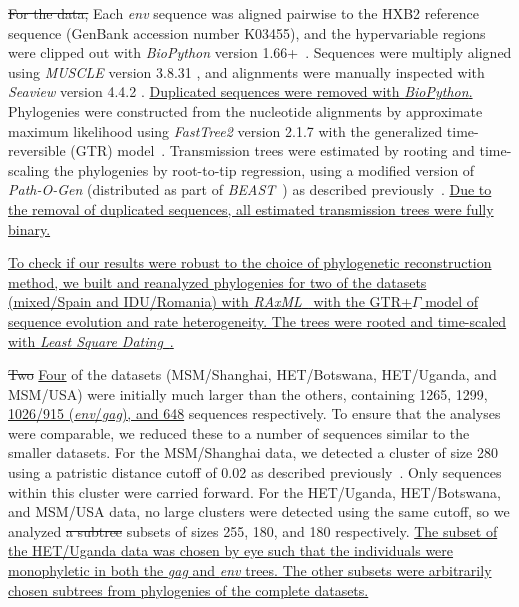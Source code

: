 \documentclass[12pt]{article}\usepackage[]{graphicx}\usepackage[]{color}
\newcommand{\add}[1]{\color{blue} \uline{#1} \color{black}}
\newcommand{\del}[1]{\color{red} \sout{#1} \color{black}}
\begin{document}
\del{For the \textcite{novitsky2014impact} data,} Each \textit{env} sequence
was aligned pairwise to the HXB2 reference sequence (GenBank accession number
K03455), and the hypervariable regions were clipped out with
\textit{BioPython} version 1.66+~\autocite{cock2009biopython}. Sequences were
multiply aligned using \textit{MUSCLE} version 3.8.31
\autocite{edgar2004muscle}, and alignments were manually inspected with
\textit{Seaview} version 4.4.2 \autocite{gouy2010seaview}. \add{Duplicated
sequences were removed with \textit{BioPython}.} Phylogenies were constructed
from the nucleotide alignments by approximate maximum likelihood using
\textit{FastTree2} version 2.1.7 \autocite{price2010fasttree} with the
generalized time-reversible (GTR) model~\autocite{tavare1986some}. Transmission
trees were estimated by rooting and time-scaling the phylogenies by root-to-tip
regression, using a modified version of \textit{Path-O-Gen} (distributed as
part of \textit{BEAST}~\autocite{drummond2007beast}) as described
previously~\autocite{poon2015phylodynamic}. \add{Due to the removal of
duplicated sequences, all estimated transmission trees were fully binary.}

\add{To check if our results were robust to the choice of phylogenetic
reconstruction method, we built and reanalyzed phylogenies for two of the
datasets (mixed/Spain and IDU/Romania) with
\textit{RAxML}~\autocite{stamatakis2014raxml} with the GTR+$\Gamma$ model of
sequence evolution and rate heterogeneity. The trees were rooted and
time-scaled with \textit{Least Square
Dating}~\autocite[\textit{LSD},][]{to2016fast}.}

\del{Two} \add{Four} of the datasets \del{\autocite{li2015hiv,novitsky2014impact}}
(MSM/Shanghai, HET/Botswana, HET/Uganda, and MSM/USA)
were initially much larger than the others, containing 1265, 1299,
\add{1026/915 (\textit{env}/\textit{gag}), and 648} sequences respectively. To
ensure that the analyses were comparable, we reduced these to a number of
sequences similar to the smaller datasets. For the MSM/Shanghai data, we
detected a cluster of size 280 using a patristic distance cutoff of 0.02 as
described previously~\autocite{poon2015impact}. Only sequences within this
cluster were carried forward. For the HET/Uganda, HET/Botswana, and MSM/USA
data, no large clusters were detected using the same cutoff, so we analyzed
\del{a subtree} subsets of sizes 255, 180, and 180 respectively. \add{The
subset of the HET/Uganda data was chosen by eye such that the individuals were
monophyletic in both the \textit{gag} and \textit{env} trees. The other
subsets were arbitrarily chosen subtrees from phylogenies of the complete
datasets.}
\end{document}
